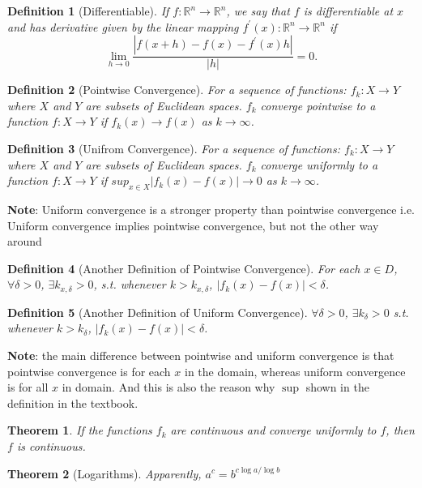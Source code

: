 \documentclass[12pt, a4paper]{article}
\newtheorem{definition}{Definition}[subsection]
\newtheorem{theorem}{Theorem}[subsection]
\begin{document}
\begin{definition}[Differentiable]
    If $f: \mathbb{R}^{n} \rightarrow \mathbb{R}^{n}$, we say that $f$ is 
    differentiable at $x$ and has derivative given by the linear mapping 
    $f^{\prime}(x): \mathbb{R}^{n} \rightarrow \mathbb{R}^{n}$ if
$$
\lim _{h \rightarrow 0} \frac{\left|f(x+h)-f(x)-f^{\prime}(x) h\right|}{|h|}=0 .
$$
\end{definition}

\begin{definition}[Pointwise Convergence]
    For a sequence of functions: $f_k : X\rightarrow Y$ where $X$ and $Y$ are subsets 
    of Euclidean spaces. $f_k$ converge pointwise to a function $f:X\rightarrow Y$ if 
    $f_k(x)\rightarrow f(x)$ as $k\rightarrow \infty$.
\end{definition}

\begin{definition}[Unifrom Convergence]
    For a sequence of functions: $f_k : X\rightarrow Y$ where $X$ and $Y$ are subsets 
    of Euclidean spaces. $f_k$ converge uniformly to a function $f:X\rightarrow Y$ if 
    $sup_{x\in X} |f_k(x)- f(x)| \rightarrow 0$ as $k\rightarrow \infty$.
\end{definition}

\textbf{Note}: Uniform convergence is a stronger property than pointwise convergence i.e. Uniform convergence implies pointwise convergence, but not the other way around

\begin{definition}[Another Definition of Pointwise Convergence]
For each $x\in D$, $\forall\delta > 0$, $\exists k_{x, \delta}>0$, s.t. whenever $k > k_{x, \delta}$, $|f_k(x)-f(x)| < \delta$.
\end{definition}

\begin{definition}[Another Definition of Uniform Convergence]
$\forall\delta >0$, $\exists k_\delta>0$ s.t. whenever $k>k_\delta$, $|f_k(x) - f(x)|<\delta$.
\end{definition}

\textbf{Note}: the main difference between pointwise and uniform convergence is that pointwise convergence is for each $x$ in the domain, whereas uniform convergence is for all $x$ in domain. And this is also the reason why $\sup$ shown in the definition in the textbook.



\begin{theorem}
    If the functions $f_k$ are continuous and converge uniformly to $f$, then $f$ is continuous. 
\end{theorem}


\begin{theorem}[Logarithms]
    Apparently, $a^c = b^{c\log a / \log b}$
\end{theorem}
\end{document}
